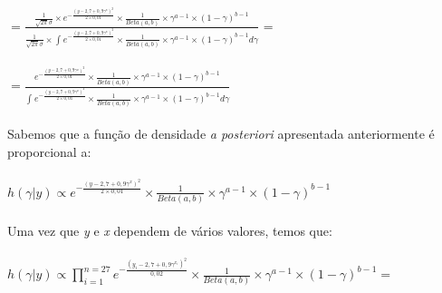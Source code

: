 \documentclass{article}
\begin{document}
				\paragraph{}
				\centerline{$= \frac{   \frac{1}{\sqrt{2\pi}\sigma}   \times   e^{-\frac{{(y-2,7+0,9\gamma^{x})}^2}{2\times0,01}}   \times    \frac{1}{Beta(a,b)}   \times   \gamma^{a-1}   \times   (1-\gamma)^{b-1}   }{   \frac{1}{\sqrt{2\pi}\sigma}   \times   \int_{}^{} e^{-\frac{{(y-2,7+0,9\gamma^{x})}^2}{2\times0,01}}   \times    \frac{1}{Beta(a,b)}   \times   \gamma^{a-1}   \times   (1-\gamma)^{b-1} d\gamma   }$ =}

				\paragraph{}
				\centerline{$= \frac{   e^{-\frac{{(y-2,7+0,9\gamma^{x})}^2}{2\times0,01}}   \times    \frac{1}{Beta(a,b)}   \times   \gamma^{a-1}   \times   (1-\gamma)^{b-1}   }{   \int_{}^{} e^{-\frac{{(y-2,7+0,9\gamma^{x})}^2}{2\times0,01}}   \times    \frac{1}{Beta(a,b)}   \times   \gamma^{a-1}   \times   (1-\gamma)^{b-1} d\gamma   }$}


				\paragraph{}
				Sabemos que a função de densidade \textit{a posteriori} apresentada anteriormente é proporcional a:

				\paragraph{}
				\centerline{$h(\gamma|y) \propto	 e^{-\frac{{(y-2,7+0,9\gamma^{x})}^2}{2\times0,01}}   \times    \frac{1}{Beta(a,b)}   \times   \gamma^{a-1}   \times   (1-\gamma)^{b-1}   $}

				\paragraph{}
				\paragraph{}
				Uma vez que \textit{y} e \textit{x} dependem de vários valores, temos que:

				\paragraph{}
				\centerline{$h(\gamma|y) \propto	 \prod_{i=1}^{n=27} e^{-\frac{{(y_{i}-2,7+0,9\gamma^{x_i})}^2}{0,02}}   \times    \frac{1}{Beta(a,b)}   \times   \gamma^{a-1}   \times   (1-\gamma)^{b-1} =    $}
\end{document}
